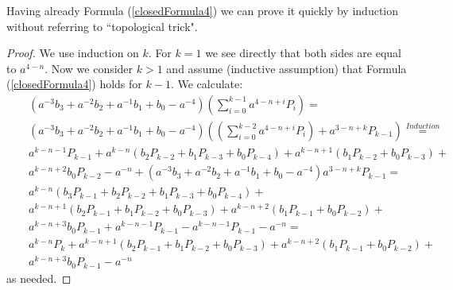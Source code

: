 \documentclass[12pt]{amsart}
\begin{document}
Having already Formula (\ref{closedFormula4}) we can prove it quickly by induction without referring to ``topological trick". 
\begin{proof} We use induction on $k$. For $k=1$ we see directly that both sides are equal to $a^{4-n}$. Now we consider $k>1$ and assume (inductive assumption) that Formula (\ref{closedFormula4}) holds for $k-1$. We calculate:
\begin{eqnarray*}
&&(a^{-3}b_3 + a^{-2}b_2 + a^{-1}b_1+b_0-a^{-4})(\sum_{i=0}^{k-1} a^{4-n+i}P_i)=\\
&&(a^{-3}b_3 + a^{-2}b_2 + a^{-1}b_1+b_0-a^{-4})((\sum_{i=0}^{k-2} a^{4-n+i}P_i) +a^{3-n+k}P_{k-1})\stackrel{Induction}{=}\\
&&a^{k-n-1}P_{k-1}+ a^{k-n}(b_2P_{k-2}+b_1P_{k-3}+b_0P_{k-4})+a^{k-n+1}(b_1P_{k-2}+b_0P_{k-3})+\\
&& a^{k-n+2}b_0P_{k-2}-a^{-n}
+(a^{-3}b_3 + a^{-2}b_2 + a^{-1}b_1+b_0-a^{-4})a^{3-n+k}P_{k-1}= \\
&&a^{k-n}(b_3P_{k-1}+ b_2P_{k-2}+b_1P_{k-3}+b_0P_{k-4})+\\ 
&& a^{k-n+1}(b_2P_{k-1}+ b_1P_{k-2}+b_0P_{k-3})
+ a^{k-n+2}(b_1P_{k-1}+ b_0P_{k-2})+\\
&& a^{k-n+3}b_0P_{k-1} + a^{k-n-1}P_{k-1}-a^{k-n-1}P_{k-1}-a^{-n}= \\
&& a^{k-n}P_k + a^{k-n+1}(b_2P_{k-1}+ b_1P_{k-2}
+b_0P_{k-3})+ a^{k-n+2}(b_1P_{k-1}+ b_0P_{k-2})+\\
&& a^{k-n+3}b_0P_{k-1} -a^{-n}
\end{eqnarray*}
as needed.
\end{proof}
\end{document}
